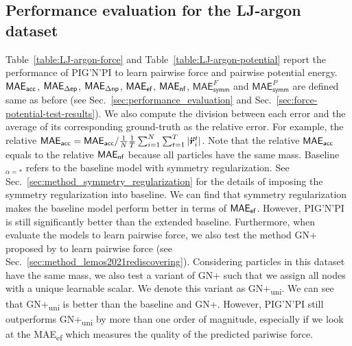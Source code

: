 \documentclass{article}
\newcommand{\pignpi}{PIG'N'PI\xspace}
\newcommand{\lemos}{GN+\xspace}
\begin{document}
\clearpage

\subsection{Performance evaluation for the LJ-argon dataset}
\label{sec:LJ-argon-evaluation}
Table~\ref{table:LJ-argon-force} and Table~\ref{table:LJ-argon-potential} report the performance of \pignpi to learn pairwise force and pairwise potential energy. $\textsf{MAE\textsubscript{acc}}$, $\textsf{MAE\textsubscript{$\Delta$ep}}$, $\textsf{MAE\textsubscript{$\Delta$np}}$, $\textsf{MAE\textsubscript{ef}}$, $\textsf{MAE\textsubscript{nf}}$, $\textsf{MAE}_\textsf{symm}^{F}$ and $\textsf{MAE}_\textsf{symm}^{P}$ are defined same as before (see Sec.~\ref{sec:performance_evaluation} and Sec.~\ref{sec:force-potential-test-results}). We also compute the division between each error and the average of its corresponding ground-truth as the relative error. For example, the relative $\textsf{MAE\textsubscript{acc}}=\textsf{MAE\textsubscript{acc}}/\frac{1}{N}\frac{1}{T}\sum_{i=1}^{N}\sum_{t=1}^{T}|\bm{\ddot{r}}_i^t|$. Note that the relative $\textsf{MAE\textsubscript{acc}}$ equals to the relative $\textsf{MAE\textsubscript{nf}}$ because all particles have the same mass. Baseline$_{\alpha=*}$ refers to the baseline model with symmetry regularization. See Sec.~\ref{sec:method_symmetry_regularization} for the details of imposing the symmetry regularization into baseline. We can find that symmetry regularization makes the baseline model perform better in terms of $\textsf{MAE\textsubscript{ef}}$. However, \pignpi is still significantly better than the extended baseline. Furthermore, when evaluate the models to learn pairwise force, we also test the method \lemos proposed by \cite{lemos2021rediscovering} to learn pairwise force (see Sec.~\ref{sec:method_lemos2021rediscovering}). Considering particles in this dataset have the same mass, we also test a variant of \lemos such that we assign all nodes with a unique learnable scalar. We denote this variant as GN+\textsubscript{uni}. We can see that GN+\textsubscript{uni} is better than the baseline and \lemos. However, \pignpi still outperforms GN+\textsubscript{uni} by more than one order of magnitude, especially if we look at the \textsf{MAE\textsubscript{ef}} which measures the quality of the predicted pariwise force.
\end{document}
